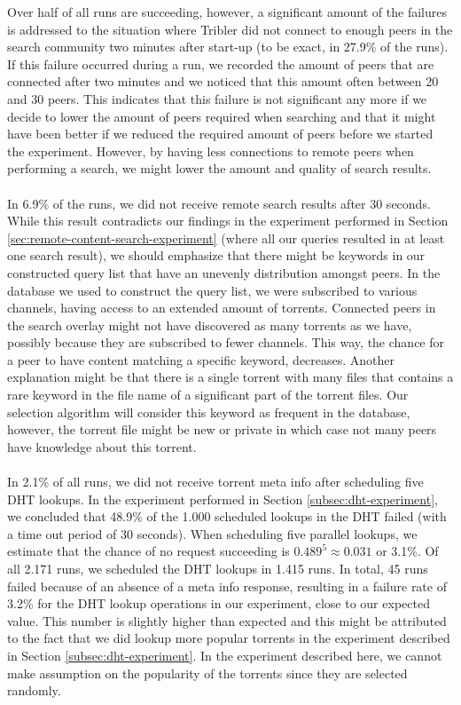 Over half of all runs are succeeding, however, a significant amount of the failures is addressed to the situation where Tribler did not connect to enough peers in the search community two minutes after start-up (to be exact, in 27.9\% of the runs). If this failure occurred during a run, we recorded the amount of peers that are connected after two minutes and we noticed that this amount often between 20 and 30 peers. This indicates that this failure is not significant any more if we decide to lower the amount of peers required when searching and that it might have been better if we reduced the required amount of peers before we started the experiment. However, by having less connections to remote peers when performing a search, we might lower the amount and quality of search results.\\\\
In 6.9\% of the runs, we did not receive remote search results after 30 seconds. While this result contradicts our findings in the experiment performed in Section \ref{sec:remote-content-search-experiment} (where all our queries resulted in at least one search result), we should emphasize that there might be keywords in our constructed query list that have an unevenly distribution amongst peers. In the database we used to construct the query list, we were subscribed to various channels, having access to an extended amount of torrents. Connected peers in the search overlay might not have discovered as many torrents as we have, possibly because they are subscribed to fewer channels. This way, the chance for a peer to have content matching a specific keyword, decreases. Another explanation might be that there is a single torrent with many files that contains a rare keyword in the file name of a significant part of the torrent files. Our selection algorithm will consider this keyword as frequent in the database, however, the torrent file might be new or private in which case not many peers have knowledge about this torrent.\\\\
In 2.1\% of all runs, we did not receive torrent meta info after scheduling five DHT lookups. In the experiment performed in Section \ref{subsec:dht-experiment}, we concluded that 48.9\% of the 1.000 scheduled lookups in the DHT failed (with a time out period of 30 seconds). When scheduling five parallel lookups, we estimate that the chance of no request succeeding is $ 0.489^5 \approx 0.031 $ or 3.1\%. Of all 2.171 runs, we scheduled the DHT lookups in 1.415 runs. In total, 45 runs failed because of an absence of a meta info response, resulting in a failure rate of 3.2\% for the DHT lookup operations in our experiment, close to our expected value. This number is slightly higher than expected and this might be attributed to the fact that we did lookup more popular torrents in the experiment described in Section \ref{subsec:dht-experiment}. In the experiment described here, we cannot make assumption on the popularity of the torrents since they are selected randomly.\\\\
